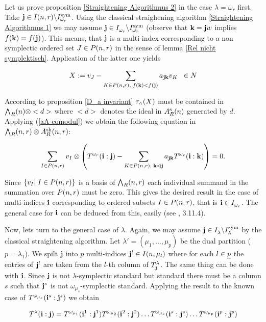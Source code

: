 \documentclass[twoside,12pt]{article}
\begin{document}
Let us prove proposition \ref{Straightening Algorithmus 2} in
the case $\lambda=\omega_r$ first. Take 
${\bf j}\in I(n,r)\backslash I_{\omega_r}^{\rm sym}$. Using the classical
straighening algorithm \ref{Straightening Algorithmus 1} we may
assume ${\bf j}\in I_{\omega_r}^{}\backslash I_{\omega_r}^{\rm sym}$
(observe that ${\bf k}={\bf j}w$ implies $f({\bf k})=f({\bf j})$). This means,
that ${\bf j}$ is a multi-index corresponding to a non symplectic ordered set
$J\in P({n},{r})$ in the sense of lemma \ref{Rel nicht
  symplektisch}. Application of the latter one yields

\[ X:=v_{J}-
\sum_{K\in P({n},{r}), \; f({\bf k})<f({\bf j})}a_{{\bf j}{\bf k}}v_{K}  \;\; \in
 N \]

According to proposition \ref{D_a invariant}  $\tau_{\wedge}(X)$ must be
contained in ${\bigwedge}_{R}(n)\otimes <d>$ where $<d>$ denotes the 
ideal in $A^{{\rm s}}_{R}(n)$ generated by $d$. Applying (\ref{aA comodul})
we obtain the following equation in ${\bigwedge}_{R}(n,r)\otimes A^{{\rm sh}}_{R}(n,r)$:

\[ \sum_{I\in P({n},{r})}v_{I}\otimes
\left(T^{\omega_r}({\bf i}:{\bf j})-\sum_{K\in P({n},{r}), \; {\bf k} 
\lhd {\bf j}}a_{{\bf j}{\bf k}}
T^{\omega_r}({\bf i}:{\bf k})\right)=0.\]

Since $\{v_{I}|\; I \in P({n},{r})\}$ is a basis of ${\bigwedge}_{R}(n,r)$ each
individual summand in the summation over $P({n},{r})$ must be zero.
This gives the desired result in the case of multi-indices ${\bf i}$
corresponding to ordered subsets $I\in P({n},{r})$, that is 
${\bf i}\in I_{\omega_r}^{}$. The general case for ${\bf i}$ can be
deduced from this, easily (see \cite{doc}, 3.11.4).\Ab

Now, lets turn to the general case of $\lambda$. Again, we may assume
${\bf j}\in I_{\lambda}^{}\backslash I_{\lambda}^{\rm sym}$ by the classical
straightening algorithm. Let $\lambda'=(\mu_1, \ldots ,
\mu_p)$  be the dual partition ($p=\lambda_1$). We spilt ${\bf j}$
into $p$ multi-indices ${\bf j}^l\in I(n,\mu_l)$ where for
each $l\in \underline{p}$ the entries of ${\bf j}^l$ are taken from the $l$-th
column of $T^{\lambda}_{{\bf j}}$. The same thing can be done with
${\bf i}$. Since ${\bf j}$ is not $\lambda$-symplectic standard but standard
there must be a column $s$ such that ${\bf j}^s$ is not
$\omega_{\mu_s}$-symplectic standard. Applying the result to the
known case of $T^{\omega_{\mu_s}}({\bf i}^s:{\bf j}^s)$ we obtain

\[ T^{\lambda}({\bf i}:{\bf j})=
T^{\omega_{\mu_1}}({\bf i}^1:{\bf j}^1)
T^{\omega_{\mu_2}}({\bf i}^2:{\bf j}^2) \ldots
T^{\omega_{\mu_s}}({\bf i}^s:{\bf j}^s) \ldots
T^{\omega_{\mu_p}}({\bf i}^p:{\bf j}^p)\]
\end{document}
